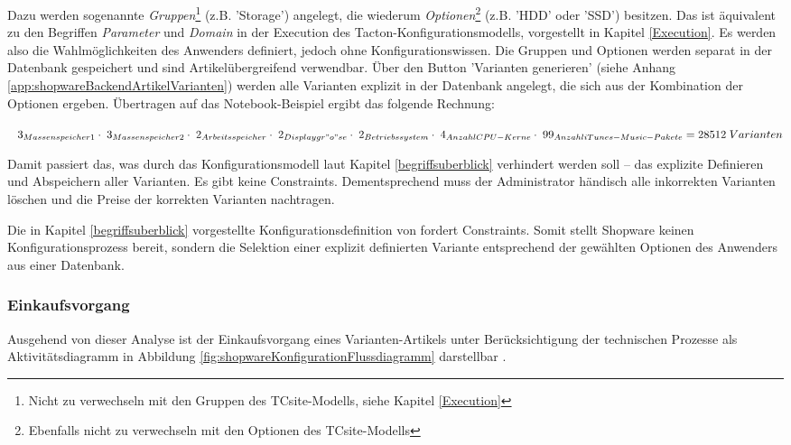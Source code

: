 \documentclass[11pt, a4paper, titlepage, listof=totoc, bibliography=totoc, index=totoc, twoside, openright, headings=normal, draft]{scrreprt}
\begin{document}
Dazu werden sogenannte \emph{Gruppen}\footnote{Nicht zu verwechseln mit den Gruppen des TCsite-Modells, siehe Kapitel \ref{Execution}} (z.B. 'Storage') angelegt, die wiederum \emph{Optionen}\footnote{Ebenfalls nicht zu verwechseln mit den Optionen des TCsite-Modells} (z.B. 'HDD' oder 'SSD') besitzen. Das ist äquivalent zu den Begriffen \emph{Parameter} und \emph{Domain} in der Execution des Tacton-Konfigurationsmodells, vorgestellt in Kapitel \ref{Execution}. Es werden also die Wahlmöglichkeiten des Anwenders definiert, jedoch ohne Konfigurationswissen. Die Gruppen und Optionen werden separat in der Datenbank gespeichert und sind Artikelübergreifend verwendbar. Über den Button 'Varianten generieren' (siehe Anhang \ref{app:shopwareBackendArtikelVarianten}) werden alle Varianten explizit in der Datenbank angelegt, die sich aus der Kombination der Optionen ergeben. Übertragen auf das Notebook-Beispiel ergibt das folgende Rechnung:

\begin{addmargin}[40pt]{0pt} 
$\;\;\;3_{Massenspeicher1}\\\cdot\;3_{Massenspeicher2}\\\cdot\;2_{Arbeitsspeicher}\\\cdot\;2_{Displaygr"o"se}\\\cdot\;2_{Betriebssystem}\\\cdot\;4_{Anzahl CPU-Kerne}\\\cdot\;99_{Anzahl iTunes-Music-Pakete}\\= 28512\;Varianten$
\end{addmargin}

Damit passiert das, was durch das Konfigurationsmodell laut Kapitel \ref{begriffsuberblick} verhindert werden soll -- das explizite Definieren und Abspeichern aller Varianten. Es gibt keine Constraints. Dementsprechend muss der Administrator händisch alle inkorrekten Varianten löschen und die Preise der korrekten Varianten nachtragen.

Die in Kapitel \ref{begriffsuberblick} vorgestellte Konfigurationsdefinition von \citet{sabin98} fordert Constraints. Somit stellt Shopware keinen Konfigurationsprozess bereit, sondern die Selektion einer explizit definierten Variante entsprechend der gewählten Optionen des Anwenders aus einer Datenbank.

\subsubsection{Einkaufsvorgang}
\label{shopwareEinkaufsvorgang}
Ausgehend von dieser Analyse ist der Einkaufsvorgang eines Varianten-Artikels unter Berücksichtigung der technischen Prozesse als Aktivitätsdiagramm in Abbildung \ref{fig:shopwareKonfigurationFlussdiagramm} darstellbar .
\end{document}
